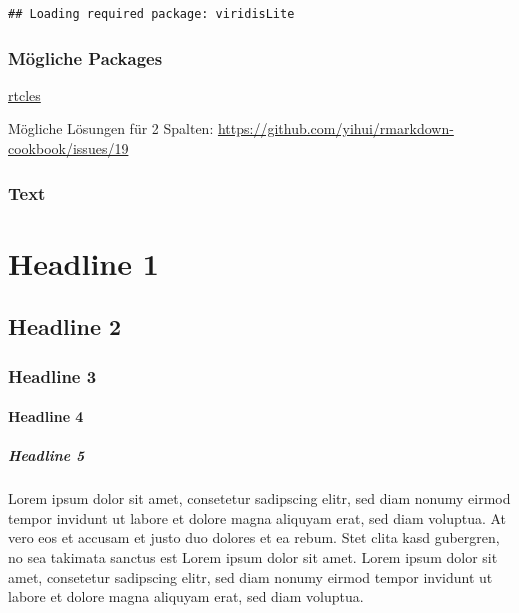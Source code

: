 \documentclass[
  twocolumn]{article}
\begin{document}
\begin{verbatim}
## Loading required package: viridisLite
\end{verbatim}

\hypertarget{muxf6gliche-packages}{%
\subsubsection{Mögliche Packages}\label{muxf6gliche-packages}}

\href{https://github.com/rstudio/rticles}{rtcles}

Mögliche Lösungen für 2 Spalten:
\url{https://github.com/yihui/rmarkdown-cookbook/issues/19}

\hypertarget{text}{%
\subsubsection{Text}\label{text}}

\hypertarget{headline-1}{%
\section{Headline 1}\label{headline-1}}

\hypertarget{headline-2}{%
\subsection{Headline 2}\label{headline-2}}

\hypertarget{headline-3}{%
\subsubsection{Headline 3}\label{headline-3}}

\hypertarget{headline-4}{%
\paragraph{Headline 4}\label{headline-4}}

\hypertarget{headline-5}{%
\subparagraph{Headline 5}\label{headline-5}}

\twocolumn

Lorem ipsum dolor sit amet, consetetur sadipscing elitr, sed diam nonumy
eirmod tempor invidunt ut labore et dolore magna aliquyam erat, sed diam
voluptua. At vero eos et accusam et justo duo dolores et ea rebum. Stet
clita kasd gubergren, no sea takimata sanctus est Lorem ipsum dolor sit
amet. Lorem ipsum dolor sit amet, consetetur sadipscing elitr, sed diam
nonumy eirmod tempor invidunt ut labore et dolore magna aliquyam erat,
sed diam voluptua.
\end{document}
